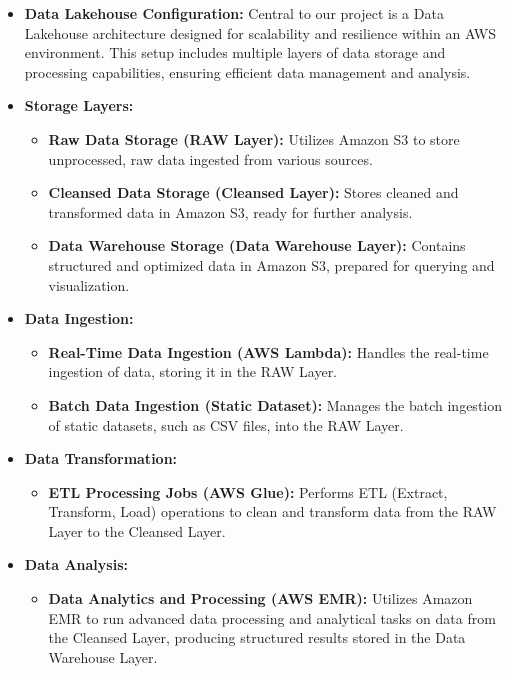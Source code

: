 \documentclass{article}
\begin{document}
\begin{itemize}
    \item \textbf{Data Lakehouse Configuration:} Central to our project is a Data Lakehouse architecture designed for scalability and resilience within an AWS environment. This setup includes multiple layers of data storage and processing capabilities, ensuring efficient data management and analysis.
    
    \item \textbf{Storage Layers:} 
        \begin{itemize}
            \item \textbf{Raw Data Storage (RAW Layer):} Utilizes Amazon S3 to store unprocessed, raw data ingested from various sources.
            \item \textbf{Cleansed Data Storage (Cleansed Layer):} Stores cleaned and transformed data in Amazon S3, ready for further analysis.
            \item \textbf{Data Warehouse Storage (Data Warehouse Layer):} Contains structured and optimized data in Amazon S3, prepared for querying and visualization.
        \end{itemize}
    
    \item \textbf{Data Ingestion:} 
        \begin{itemize}
            \item \textbf{Real-Time Data Ingestion (AWS Lambda):} Handles the real-time ingestion of data, storing it in the RAW Layer.
            \item \textbf{Batch Data Ingestion (Static Dataset):} Manages the batch ingestion of static datasets, such as CSV files, into the RAW Layer.
        \end{itemize}
    
    \item \textbf{Data Transformation:} 
        \begin{itemize}
            \item \textbf{ETL Processing Jobs (AWS Glue):} Performs ETL (Extract, Transform, Load) operations to clean and transform data from the RAW Layer to the Cleansed Layer.
        \end{itemize}
    
    \item \textbf{Data Analysis:} 
        \begin{itemize}
            \item \textbf{Data Analytics and Processing (AWS EMR):} Utilizes Amazon EMR to run advanced data processing and analytical tasks on data from the Cleansed Layer, producing structured results stored in the Data Warehouse Layer.
        \end{itemize}
    

\end{itemize}
\end{document}
